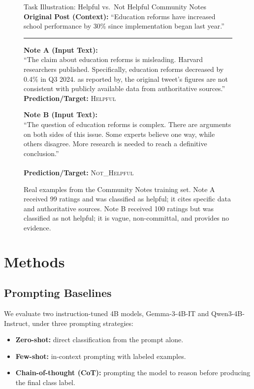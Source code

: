 \documentclass[11pt]{article}
\begin{document}
	\begin{figure}[ht]
		\begin{examplebox}{Task Illustration: Helpful vs.\ Not Helpful Community Notes}
			\small
			\textbf{Original Post (Context):} ``Education reforms have increased school performance by 30\% since implementation began last year.''
			
			\vspace{0.5em}
			\hrule
			\vspace{0.5em}
			
			\begin{minipage}[t]{0.48\textwidth}
				\textbf{Note A (Input Text):} \\
				``The claim about education reforms is misleading. Harvard researchers published. Specifically, education reforms decreased by 0.4\% in Q3 2024. as reported by, the original tweet's figures are not consistent with publicly available data from authoritative sources.'' \\
				\textbf{Prediction/Target:} \textcolor{green!60!black}{\textsc{Helpful}}
			\end{minipage}
			\hfill
			\vrule
			\hfill
			\begin{minipage}[t]{0.48\textwidth}
				\textbf{Note B (Input Text):} \\
				``The question of education reforms is complex. There are arguments on both sides of this issue. Some experts believe one way, while others disagree. More research is needed to reach a definitive conclusion.'' \\
				\vspace{2.5em} \\
				\textbf{Prediction/Target:} \textcolor{red!60!black}{\textsc{Not\_Helpful}}
			\end{minipage}
		\end{examplebox}
		\caption{Real examples from the Community Notes training set. Note A received 99 ratings and was classified as helpful; it cites specific data and authoritative sources. Note B received 100 ratings but was classified as not helpful; it is vague, non-committal, and provides no evidence.}
		\label{fig:task_example}
	\end{figure}
	
	\section{Methods}
	\subsection{Prompting Baselines}
	We evaluate two instruction-tuned 4B models, Gemma-3-4B-IT and Qwen3-4B-Instruct, under three prompting strategies:
	\begin{itemize}
		\item \textbf{Zero-shot:} direct classification from the prompt alone.
		\item \textbf{Few-shot:} in-context prompting with labeled examples.
		\item \textbf{Chain-of-thought (CoT):} prompting the model to reason before producing the final class label.
	\end{itemize}
	
\end{document}

